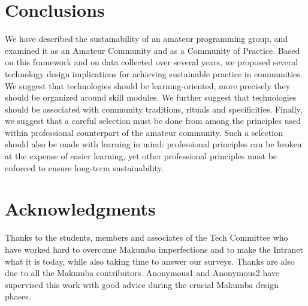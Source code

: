 \documentclass{acm_proc_article-sp}
\begin{document}
\section{Conclusions}\label{sec:conclusions}
We have described the sustainability of an amateur programming group, and examined it as an Amateur Community and as a Community of Practice. Based on this framework and on data collected over several years, we proposed several technology design implications for achieving sustainable practice in communities. We suggest that technologies should be learning-oriented, more precisely they should be organized around skill modules. We further suggest that technologies should be associated with community traditions, rituals and specificities. Finally, we suggest that a careful selection must be done from among the principles used within professional counterpart of the amateur community. Such a selection should also be made with learning in mind: professional principles can be broken at the expense of easier learning, yet other professional principles must be enforced to ensure long-term sustainability.

\section{Acknowledgments}\label{sec:acknowledgments}
Thanks to the students, members and associates of the Tech Committee who have worked hard to overcome Makumba imperfections and to make the Intranet what it is today, while also taking time to answer our surveys.  Thanks are also due to all the Makumba contributors.  Anonymous1 and Anonymous2 have supervised this work with good advice during the crucial Makumba design phases.

%

 

%

\balancecolumns
\end{document}
